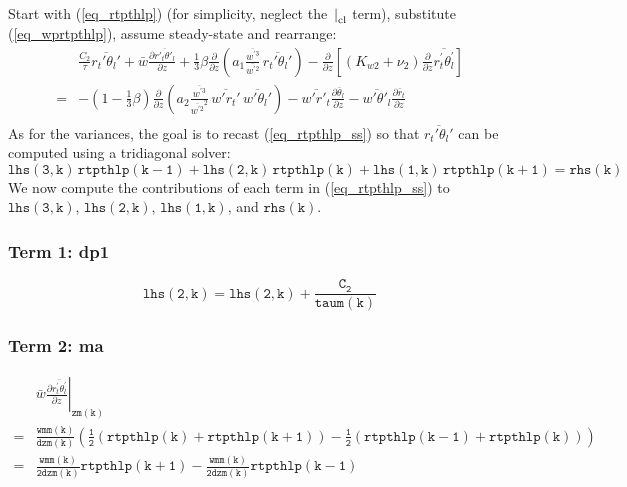 \documentclass[11pt,fleqn]{article}
\newcommand{\ptlder}[2]{\frac{\partial #1}{\partial #2}}
\begin{document}
Start with (\ref{eq_rtpthlp}) (for simplicity, neglect the 
$\left.\right|_{\rm{cl}}$ term), substitute (\ref{eq_wprtpthlp}), assume 
steady-state and rearrange:
%
\begin{equation}
\label{eq_rtpthlp_ss}
\begin{split}
& \frac{C_2}{\tau} \overline{r_t' \theta_l'}
+ \bar{w}\ptlder{\overline{r'_t\theta'_l}}{z}
+ \frac{1}{3} \beta
   \ptlder{}{z}
     \left( 
       a_1
       \frac{\overline{w^{'3}}}{\overline{w^{'2}}} \,
       \overline{r_t'\theta_l'}
     \right)
- \ptlder{}{z} \left[ \left( K_{w2} + \nu_2 \right)
                      \ptlder{}{z} \overline{r_t^{'}\theta_l^{'}}
               \right]  \\
=& 
   - \left( 1 - \frac{1}{3}\beta \right)
      \ptlder{}{z}
        \left( 
          a_2
          \frac{\overline{w^{'3}}}{\overline{w^{'2}}^2} \,
          \overline{w'r_t'} \, \overline{w'\theta_l'}
        \right)
   - \overline{w'r'_t}\ptlder{\bar{\theta}_l}{z} 
   - \overline{w'\theta'_l}\ptlder{\bar{r}_t}{z} \\
\end{split}
\end{equation}
%
As for the variances, the goal is to recast (\ref{eq_rtpthlp_ss}) so that 
$\overline{r_t'\theta_l'}$ can be computed using a tridiagonal solver:
%
\begin{equation}
\mathtt{ lhs(3,k) \, rtpthlp(k-1) + lhs(2,k) \, rtpthlp(k) + lhs(1,k) \, rtpthlp(k+1) = rhs(k) }
\end{equation}
%
We now compute the contributions of each term in (\ref{eq_rtpthlp_ss}) to
$\mathtt{lhs(3,k)}$, $\mathtt{lhs(2,k)}$, $\mathtt{lhs(1,k)}$, 
and $\mathtt{rhs(k)}$.

\subsubsection{Term 1:  dp1}

\begin{equation}
\mathtt{ lhs(2,k) = lhs(2,k) + \frac{C_2}{taum(k)} }
\end{equation}

\subsubsection{Term 2:  ma}

\begin{equation}
\begin{split}
& \left. \bar{w}\ptlder{\overline{r_t^{'}\theta_l^{'}}}{z} \right|_{\mathtt{zm(k)}} \\
=& \mathtt{ \frac{wmm(k)}{dzm(k)}
   \left(
     \frac{1}{2} \left( rtpthlp(k)+rtpthlp(k+1) \right)
     - \frac{1}{2} \left( rtpthlp(k-1)+rtpthlp(k) \right)
   \right) } \\
=& \mathtt{ \frac{wmm(k)}{2 dzm(k)} rtpthlp(k+1) - \frac{wmm(k)}{2 dzm(k)} rtpthlp(k-1) }
\end{split}
\end{equation}
\end{document}
